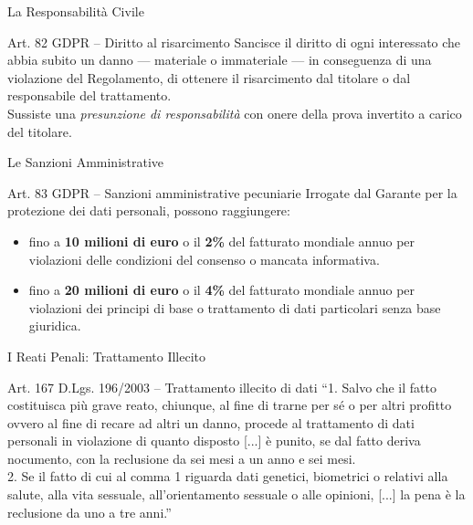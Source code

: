 \documentclass[aspectratio=169]{beamer}
\begin{document}
\begin{frame}{La Responsabilità Civile}
  \begin{block}{Art. 82 GDPR -- Diritto al risarcimento}
    Sancisce il diritto di ogni interessato che abbia subito un danno --- materiale o immateriale --- in conseguenza di una violazione del Regolamento, di ottenere il risarcimento dal titolare o dal responsabile del trattamento.\\
    Sussiste una \emph{presunzione di responsabilità} con onere della prova invertito a carico del titolare.
  \end{block}
\end{frame}

\begin{frame}{Le Sanzioni Amministrative}
  \begin{block}{Art. 83 GDPR -- Sanzioni amministrative pecuniarie}
    Irrogate dal Garante per la protezione dei dati personali, possono raggiungere:
    \begin{itemize}
      \item fino a \textbf{10 milioni di euro} o il \textbf{2\%} del fatturato mondiale annuo per violazioni delle condizioni del consenso o mancata informativa.
      \item fino a \textbf{20 milioni di euro} o il \textbf{4\%} del fatturato mondiale annuo per violazioni dei principi di base o trattamento di dati particolari senza base giuridica.
    \end{itemize}
  \end{block}
\end{frame}

\begin{frame}{I Reati Penali: Trattamento Illecito}
  \begin{block}{Art. 167 D.Lgs. 196/2003 -- Trattamento illecito di dati}
    \small
    ``1. Salvo che il fatto costituisca più grave reato, chiunque, al fine di trarne per sé o per altri profitto ovvero al fine di recare ad altri un danno, procede al trattamento di dati personali in violazione di quanto disposto [...] è punito, se dal fatto deriva nocumento, con la reclusione da sei mesi a un anno e sei mesi.\\
    2. Se il fatto di cui al comma 1 riguarda dati genetici, biometrici o relativi alla salute, alla vita sessuale, all'orientamento sessuale o alle opinioni, [...] la pena è la reclusione da uno a tre anni.''
  \end{block}
\end{frame}
\end{document}
